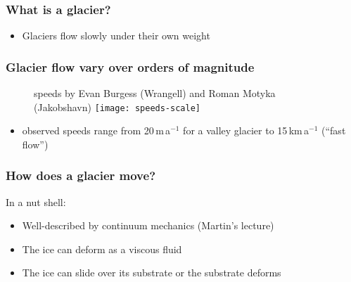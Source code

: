 \documentclass[hide notes,intlimits,unknownkeysallowed]{beamer}
\begin{document}
{
%
} 

\begin{frame}
  \frametitle{What is a glacier?}
  \begin{itemize}
  \item Glaciers flow slowly under their own weight
  \end{itemize}
\end{frame}


\begin{frame}
  \frametitle{Glacier flow vary over orders of magnitude}
  \begin{figure}
    \scriptsize{speeds by Evan Burgess (Wrangell) and Roman Motyka (Jakobshavn)}
    \texttt{[image: speeds-scale]}
  \end{figure}
  \begin{itemize}
    \item observed speeds range from 20\,m\,a$^{-1}$ for a valley glacier to 15\,km\,a$^{-1}$ (``fast flow'')
  \end{itemize}
  \note[itemize]{
}
\end{frame}

\begin{frame}
  \frametitle{How does a glacier move?}
  \begin{block}{In a nut shell:}
    \begin{itemize}
    \item Well-described by continuum mechanics (Martin's lecture)
    \item The ice can deform as a viscous fluid
    \item The ice can slide over its substrate or the substrate deforms
    \end{itemize}
  \end{block}
\end{frame}
\end{document}
